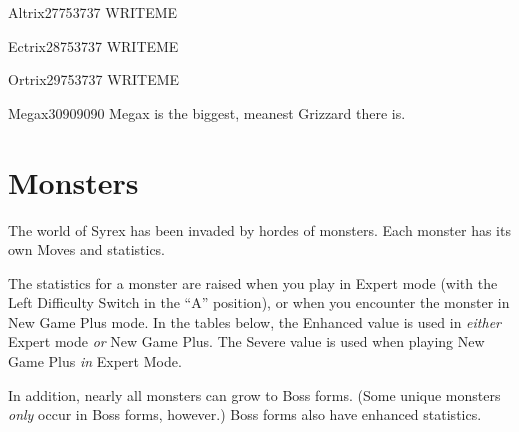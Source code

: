 \documentclass[10pt,twocolumn]{memoir}
\begin{document}
\begin{grizzardpage}{Altrix}{27}{75}{37}{37}{}
  WRITEME
\end{grizzardpage}

\begin{grizzardpage}{Ectrix}{28}{75}{37}{37}{}
  WRITEME
\end{grizzardpage}

\begin{grizzardpage}{Ortrix}{29}{75}{37}{37}{}
  WRITEME
\end{grizzardpage}

\begin{grizzardpage}{Megax}{30}{90}{90}{90}{}
  Megax is the biggest, meanest Grizzard there is.
\end{grizzardpage}

\chapter{Monsters}\label{ch:Monsters}

The world of Syrex has been  invaded by hordes of monsters. Each monster
has its own Moves and statistics.

The statistics  for a monster  are raised when  you play in  Expert mode
(with the  Left Difficulty Switch  in the  ``A'' position), or  when you
encounter the  monster in New Game  Plus mode. In the  tables below, the
Enhanced value is  used in \emph{either} Expert mode  \emph{or} New Game
Plus. The  Severe value  is used  when playing  New Game  Plus \emph{in}
Expert Mode.



In addition,  nearly all monsters can  grow to Boss forms.  (Some unique
monsters \emph{only} occur in Boss forms, however.) Boss forms also have
enhanced statistics.

\newcommand\twicely[1]{\the\numexpr#1*2\relax}
\newcommand\thricely[1]{\the\numexpr#1*3\relax}
\newcommand\fourxly[1]{\the\numexpr#1*4\relax}
\newcommand\eightxly[1]{\the\numexpr#1*8\relax}

\newcommand\bytewise[1]{\ifnum #1 > 255
  {255}
  \else
  #1
  \fi}

\newcommand\twice[1]{\bytewise{\twicely{#1}}}
\newcommand\thrice[1]{\bytewise{\thricely{#1}}}
\newcommand\fourx[1]{\bytewise{\fourxly{#1}}}
\newcommand\eightx[1]{\bytewise{\eightxly{#1}}}
\end{document}

